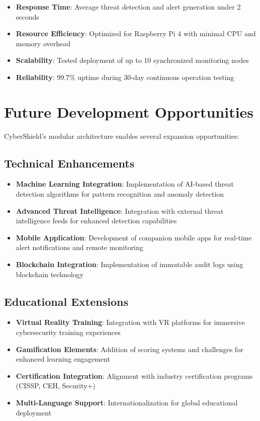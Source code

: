 \documentclass[12pt,a4paper]{report}
\begin{document}
\begin{itemize}
    \item \textbf{Response Time}: Average threat detection and alert generation under 2 seconds
    \item \textbf{Resource Efficiency}: Optimized for Raspberry Pi 4 with minimal CPU and memory overhead
    \item \textbf{Scalability}: Tested deployment of up to 10 synchronized monitoring nodes
    \item \textbf{Reliability}: 99.7\% uptime during 30-day continuous operation testing
\end{itemize}

\section{Future Development Opportunities}

CyberShield's modular architecture enables several expansion opportunities:

\subsection{Technical Enhancements}

\begin{itemize}
    \item \textbf{Machine Learning Integration}: Implementation of AI-based threat detection algorithms for pattern recognition and anomaly detection
    \item \textbf{Advanced Threat Intelligence}: Integration with external threat intelligence feeds for enhanced detection capabilities
    \item \textbf{Mobile Application}: Development of companion mobile apps for real-time alert notifications and remote monitoring
    \item \textbf{Blockchain Integration}: Implementation of immutable audit logs using blockchain technology
\end{itemize}

\subsection{Educational Extensions}

\begin{itemize}
    \item \textbf{Virtual Reality Training}: Integration with VR platforms for immersive cybersecurity training experiences
    \item \textbf{Gamification Elements}: Addition of scoring systems and challenges for enhanced learning engagement
    \item \textbf{Certification Integration}: Alignment with industry certification programs (CISSP, CEH, Security+)
    \item \textbf{Multi-Language Support}: Internationalization for global educational deployment
\end{itemize}
\end{document}

